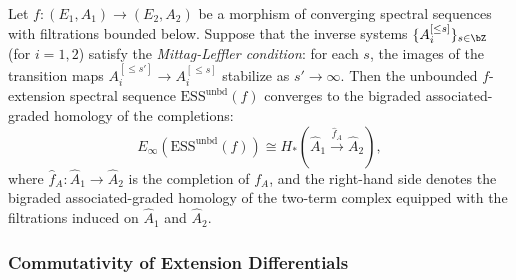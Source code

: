 \begin{axiom}\label{prereq:ax:unbounded-ess-convergence}
    Let $f: (E_1, A_1) \to (E_2, A_2)$ be a morphism of converging spectral sequences with filtrations bounded below. Suppose that the inverse systems $\{A_i^{[\le s]}\}_{s \in \bZ}$ (for $i = 1, 2$) satisfy the \emph{Mittag-Leffler condition}: for each $s$, the images of the transition maps $A_i^{[\le s']} \to A_i^{[\le s]}$ stabilize as $s' \to \infty$. Then the unbounded $f$-extension spectral sequence $\mathrm{ESS}^{\mathrm{unbd}}(f)$ converges to the bigraded associated-graded homology of the completions:
    $$E_\infty\!\left(\mathrm{ESS}^{\mathrm{unbd}}(f)\right) \cong H_*\!\left(\widehat{A}_1 \xrightarrow{\hat{f}_A} \widehat{A}_2\right),$$
    where $\hat{f}_A: \widehat{A}_1 \to \widehat{A}_2$ is the completion of $f_A$, and the right-hand side denotes the bigraded associated-graded homology of the two-term complex equipped with the filtrations induced on $\widehat{A}_1$ and $\widehat{A}_2$.
\end{axiom}

\subsubsection{Commutativity of Extension Differentials}\label{sec:prereq-commutativity}

